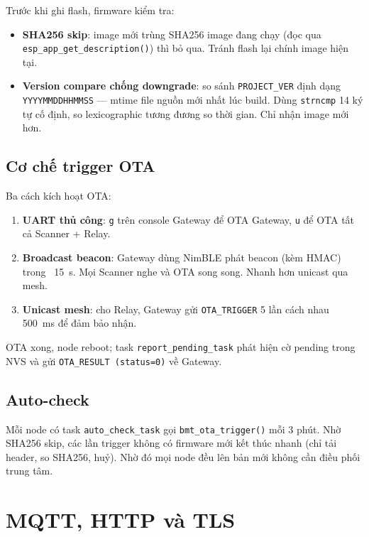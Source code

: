 Trước khi ghi flash, firmware kiểm tra:

\begin{itemize}
    \item \textbf{SHA256 skip}: image mới trùng SHA256 image đang chạy (đọc qua \texttt{esp\_app\_get\_description()}) thì bỏ qua. Tránh flash lại chính image hiện tại.

    \item \textbf{Version compare chống downgrade}: so sánh \texttt{PROJECT\_VER} định dạng \texttt{YYYYMMDDHHMMSS} --- mtime file nguồn mới nhất lúc build. Dùng \texttt{strncmp} 14 ký tự cố định, so lexicographic tương đương so thời gian. Chỉ nhận image mới hơn.
\end{itemize}

\subsection{Cơ chế trigger OTA}

Ba cách kích hoạt OTA:

\begin{enumerate}
    \item \textbf{UART thủ công}: \texttt{g} trên console Gateway để OTA Gateway, \texttt{u} để OTA tất cả Scanner + Relay.

    \item \textbf{Broadcast beacon}: Gateway dùng NimBLE phát beacon (kèm HMAC) trong ~15~s. Mọi Scanner nghe và OTA song song. Nhanh hơn unicast qua mesh.

    \item \textbf{Unicast mesh}: cho Relay, Gateway gửi \texttt{OTA\_TRIGGER} 5 lần cách nhau 500~ms để đảm bảo nhận.
\end{enumerate}

OTA xong, node reboot; task \texttt{report\_pending\_task} phát hiện cờ pending trong NVS và gửi \texttt{OTA\_RESULT (status=0)} về Gateway.

\subsection{Auto-check}

Mỗi node có task \texttt{auto\_check\_task} gọi \texttt{bmt\_ota\_trigger()} mỗi 3 phút. Nhờ SHA256 skip, các lần trigger không có firmware mới kết thúc nhanh (chỉ tải header, so SHA256, huỷ). Nhờ đó mọi node đều lên bản mới không cần điều phối trung tâm.

\section{MQTT, HTTP và TLS}
\label{sec:mqtt-http-tls}

